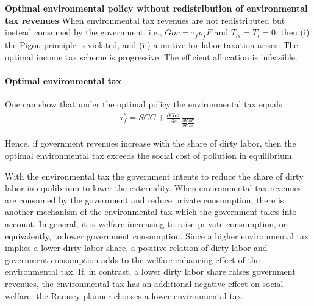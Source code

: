 \begin{prop}\label{prop:2}\textbf{Optimal environmental policy without redistribution of environmental tax revenues}
When environmental tax revenues are not redistributed but instead consumed by the government, i.e., $Gov=\tau_fp_fF$ and $T_{ls}=T_\iota=0$, then (i) the Pigou principle is violated, and (ii) a motive for labor taxation arises: The optimal income tax scheme is progressive. %
The efficient allocation is infeasible.  
\end{prop}

\paragraph{Optimal environmental tax}
One can show that under the optimal policy the environmental tax equals
	\begin{align}
\tau_{f}^*= SCC+\frac{\partial Gov}{\partial s}\frac{1}{\frac{\partial Y}{\partial F}\frac{\partial F}{\partial s}}.
\end{align}
\begin{comment}
content...

This can be further simplified:
\begin{align}
\tau_f^* = 1-\frac{SCC}{\frp{w}{s}}w. 
\end{align}
A condition for $\tau_f$ to exceed the social cost of the externality reads
\begin{align}
SCC<\frac{1}{1+\frac{w}{\frp{w}{s}}}
\end{align}
\end{comment}
Hence, if government revenues increase with the share of dirty labor, then the optimal environmental tax exceeds the social cost of pollution in equilibrium. 	

With the environmental tax the government intents to reduce the share of dirty labor in equilibrium to lower the externality. 
When environmental tax revenues are consumed by the government and reduce private consumption, there is another mechanism of the environmental tax which the government takes into account. In general, it is welfare increasing to raise private consumption, or, equivalently, to lower government consumption. Since a higher environmental tax implies a lower dirty labor share, a positive relation of dirty labor and government consumption adds to the welfare enhancing effect of the environmental tax. If, in contrast, a lower dirty labor share raises government revenues, the environmental tax has an additional negative effect on social welfare: the Ramsey planner chooses a lower environmental tax. 

